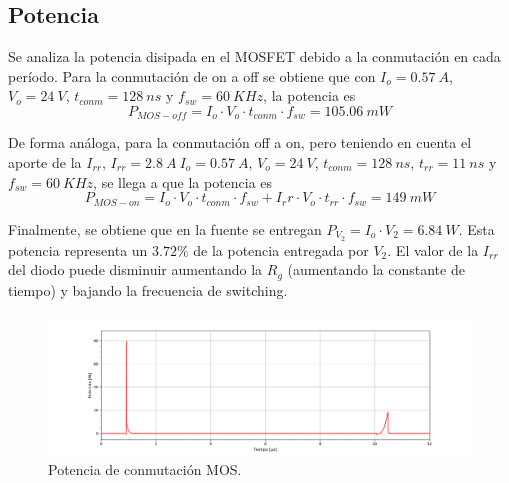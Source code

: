 \subsection{Potencia}
Se analiza la potencia disipada en el MOSFET debido a la conmutación en cada período.
Para la conmutación de on a off se obtiene que con $I_o = 0.57 \ A$, $V_o = 24 \ V$, $t_{conm}= 128 \ ns$ y $f_{sw}=60 \ KHz$, la potencia es
\begin{equation}
P_{MOS-off}=I_o \cdot V_o \cdot t_{conm} \cdot f_{sw} = 105.06 \ mW
\end{equation}

De forma análoga, para la conmutación off a on, pero teniendo en cuenta el aporte de la $I_{rr}$, $I_{rr} = 2.8 \ A \ I_o = 0.57 \ A$, $V_o = 24 \ V$, $ t_{conm}= 128 \ ns$, $ t_{rr}= 11 \ ns$ y $f_{sw}=60 \ KHz$, se llega a que la potencia es
\begin{equation}
P_{MOS-on}=I_o \cdot V_o \cdot t_{conm} \cdot f_{sw} + I_rr \cdot V_o \cdot t_{rr} \cdot f_{sw}=  149\ mW
\end{equation}

Finalmente, se obtiene que en la fuente se entregan $P_{V_2}=I_o \cdot V_2 = 6.84 \ W$. Esta potencia representa un $3.72 \%$ de la potencia entregada por $V_2$.
El valor de la $I_{rr}$ del diodo puede disminuir aumentando la $R_g$ (aumentando la constante de tiempo) y bajando la frecuencia de switching. 
\begin{figure}[H]
	\centering
	\includegraphics[width=\linewidth]{ImagenesEjercicio-3/potencia-mos}
	\caption{Potencia de conmutación MOS.}
	\label{fig:ej3:conmutacionON_OFF_VDS_IDS_SWITCH_BOOST}
\end{figure}

